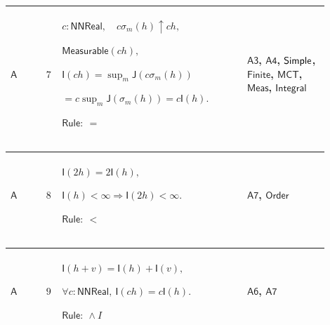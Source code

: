 \documentclass[12pt,reqno]{amsart}
\theoremstyle{blueplain}
\numberwithin{equation}{section}
\begin{document}
{\scriptsize \setlength{\parskip}{0pt}\nointerlineskip
\noindent 
\begin{tabular}{|@{}>{\centering\arraybackslash}m{0.10658\linewidth}|>{\centering\arraybackslash}m{0.03553\linewidth}|>{\centering\arraybackslash}m{0.52105\linewidth}|>{\centering\arraybackslash}m{0.23684\linewidth}|}
\hline
\hypertarget{dct:A7}{$\displaystyle \mathsf{A}$} & $\displaystyle 7$ & $%
\displaystyle c:\mathsf{NNReal},\quad c\sigma_m(h)\uparrow ch,$\par$%
\displaystyle \mathsf{Measurable}(ch),$\par$\displaystyle \mathsf{I}%
(ch)=\sup_m\mathsf{J}(c\sigma_m(h))$\par$\displaystyle {}=c\sup_m\mathsf{J}%
(\sigma_m(h))=c\mathsf{I}(h).$\par$\displaystyle \mathsf{Rule}:\ =$ & 
\hyperlink{dct:A3}{$\displaystyle \mathsf{A3}$}, \hyperlink{dct:A4}{$%
\displaystyle \mathsf{A4}$}, \hyperlink{lem:Simple}{$\displaystyle \mathsf{%
Simple}$}, \hyperlink{lem:Finite}{$\displaystyle \mathsf{Finite}$}, 
\hyperlink{lem:MCT}{$\displaystyle \mathsf{MCT}$}, \hyperlink{lem:Meas}{$%
\displaystyle \mathsf{Meas}$}, \hyperlink{lem:Integral}{$\displaystyle 
\mathsf{Integral}$} \\ \hline
\end{tabular}%
}

{\scriptsize \setlength{\parskip}{0pt}\nointerlineskip
\noindent 
\begin{tabular}{|@{}>{\centering\arraybackslash}m{0.10658\linewidth}|>{\centering\arraybackslash}m{0.03553\linewidth}|>{\centering\arraybackslash}m{0.52105\linewidth}|>{\centering\arraybackslash}m{0.23684\linewidth}|}
\hline
\hypertarget{dct:A8}{$\displaystyle \mathsf{A}$} & $\displaystyle 8$ & $%
\displaystyle \mathsf{I}(2h)=2\mathsf{I}(h),$\par$\displaystyle \mathsf{I}%
(h)<\infty\Rightarrow\mathsf{I}(2h)<\infty.$\par$\displaystyle \mathsf{Rule}%
:\ <$ & \hyperlink{dct:A7}{$\displaystyle \mathsf{A7}$}, \hyperlink{ax:Order}%
{$\displaystyle \mathsf{Order}$} \\ \hline
\end{tabular}%
}

{\scriptsize \setlength{\parskip}{0pt}\nointerlineskip
\noindent 
\begin{tabular}{|@{}>{\centering\arraybackslash}m{0.10658\linewidth}|>{\centering\arraybackslash}m{0.03553\linewidth}|>{\centering\arraybackslash}m{0.52105\linewidth}|>{\centering\arraybackslash}m{0.23684\linewidth}|}
\hline
\hypertarget{dct:A9}{$\displaystyle \mathsf{A}$} & $\displaystyle 9$ & $%
\displaystyle \mathsf{I}(h+v)=\mathsf{I}(h)+\mathsf{I}(v),$\par$%
\displaystyle \forall c:\mathsf{NNReal},\ \mathsf{I}(ch)=c\mathsf{I}(h).$\par%
$\displaystyle \mathsf{Rule}:\ \land I$ & \hyperlink{dct:A6}{$\displaystyle 
\mathsf{A6}$}, \hyperlink{dct:A7}{$\displaystyle \mathsf{A7}$} \\ \hline
\end{tabular}%
}
\end{document}
